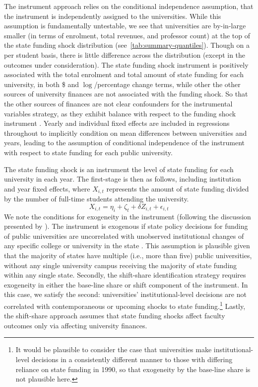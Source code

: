 The instrument approach relies on the conditional independence assumption, that the instrument is independently assigned to the universities.
While this assumption is fundamentally untestable, we see that universities are by-in-large smaller (in terms of enrolment, total revenues, and professor count) at the top of the state funding shock distribution (see~\autoref{tab:summary-quantiles}).
Though on a per student basis, there is little difference across the distribution (except in the outcomes under consideration).
The state funding shock instrument is positively associated with the total enrolment and total amount of state funding for each university, in both \$ and $\log$/percentage change terms, while other the other sources of university finances are not associated with the funding shock.
So that the other sources of finances are not clear confounders for the instrumental variables strategy, as they exhibit balance with respect to the funding shock instrument \citep{pei2019poorly}.
Yearly and individual fixed effects are included in regressions throughout to implicitly condition on mean differences between universities and years, leading to the assumption of conditional independence of the instrument with respect to state funding for each public university.

The state funding shock is an instrument the level of state funding for each university in each year.  
The first-stage is then as follows, including institution and year fixed effects, where $X_{i,t}$ represents the amount of state funding divided by the number of full-time students attending the university.
\begin{equation}
    \label{eqn:firststage}
    X_{i,t} = \eta_i + \zeta_t + \delta Z_{i,t} + \epsilon_{i,t}
\end{equation}
We note the conditions for exogeneity in the instrument (following the discussion presented by \citealt{NBERw27885}).
The instrument is exogenous if state policy decisions for funding of public universities are uncorrelated with unobserved institutional changes of any specific college or university in the state \citep{borusyak2022quasi}.
This assumption is plausible given that the majority of states have multiple (i.e., more than five) public universities, without any single university campus receiving the majority of state funding within any single state.
Secondly, the shift-share identification strategy requires exogeneity in either the base-line share or shift component of the instrument.
In this case, we satisfy the second: universities' institutional-level decisions are not correlated with contemporaneous or upcoming shocks to state funding.\footnote{
    It would be plausible to consider the case that universities make institutional-level decisions in a consistently different manner to those 
    with differing reliance on state funding in 1990, so that exogeneity by the base-line share is not plausible here.
}
Lastly, the shift-share approach assumes that state funding shocks affect faculty outcomes only via affecting university finances.

